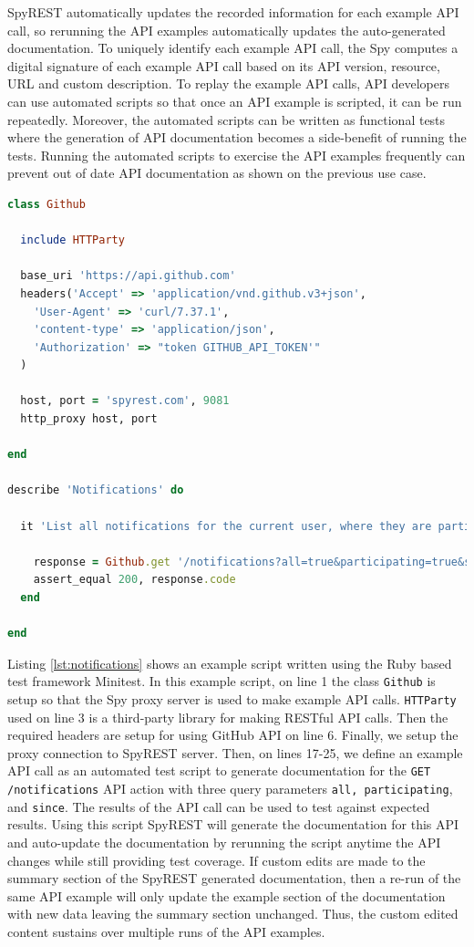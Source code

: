 \documentclass[conference]{IEEEtran}
\begin{document}
SpyREST automatically updates the recorded information for each example API call, so rerunning the API examples automatically updates the auto-generated documentation. To uniquely identify each example API call, the Spy computes a digital signature of each example API call based on its API version, resource, URL and custom description. To replay the example API calls, API developers can use automated scripts so that once an API example is scripted, it can be run repeatedly. Moreover, the automated scripts can be written as functional tests where the generation of API documentation becomes a side-benefit of running the tests. Running the automated scripts to exercise the API examples frequently can prevent out of date API documentation as shown on the previous use case.

\begin{lstlisting}[language=ruby, breaklines=true, caption={}, label=list:ex, float,floatplacement=H, caption=Example API call using SpyREST, label={lst:notifications}]
class Github

  include HTTParty

  base_uri 'https://api.github.com'
  headers('Accept' => 'application/vnd.github.v3+json',
    'User-Agent' => 'curl/7.37.1',
    'content-type' => 'application/json',
    'Authorization' => "token GITHUB_API_TOKEN'"
  )

  host, port = 'spyrest.com', 9081
  http_proxy host, port

end

describe 'Notifications' do

  it 'List all notifications for the current user, where they are participating, since a time' do

    response = Github.get '/notifications?all=true&participating=true&since=2014-01-01T00:00:00Z'
    assert_equal 200, response.code
  end

end\end{lstlisting}

Listing \ref{lst:notifications} shows an example script written using the Ruby based test framework Minitest. In this example script, on line 1 the class \texttt{Github} is setup so that the Spy proxy server is used to make example API calls. \texttt{HTTParty} used on line 3 is a third-party library for making RESTful API calls. Then the required headers are setup for using GitHub API on line 6. Finally, we setup the proxy connection to SpyREST server. Then, on lines 17-25, we define an example API call as an automated test script to generate documentation for the \texttt{GET /notifications} API action with three query parameters \texttt{all, participating}, and \texttt{since}. The results of the API call can be used to test against expected results. Using this script SpyREST will generate the documentation for this API and auto-update the documentation by rerunning the script anytime the API changes while still providing test coverage. If custom edits are made to the summary section of the SpyREST generated documentation, then a re-run of the same API example will only update the example section of the documentation with new data leaving the summary section unchanged. Thus, the custom edited content sustains over multiple runs of the API examples.
\end{document}
